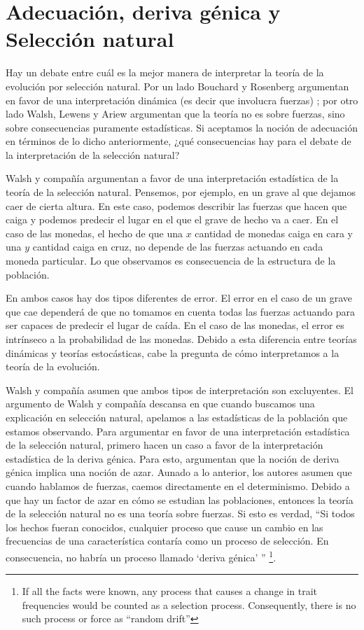  \section{Adecuación, deriva génica y Selección natural}

 \noindent Hay un debate entre cuál es la mejor manera de interpretar la teoría de la evolución por selección natural. Por un lado Bouchard y Rosenberg argumentan en favor de una interpretación dinámica (es decir que involucra fuerzas) \citeyear{Bouchard2004}; por otro lado Walsh, Lewens y Ariew \citeyear{Walsh2002} argumentan que la teoría no es sobre fuerzas, sino sobre consecuencias puramente estadísticas. Si aceptamos la noción de adecuación en términos de lo dicho anteriormente, ¿qué consecuencias hay para el debate de la interpretación de la selección natural?

 Walsh y compañía argumentan a favor de una interpretación estadística de la teoría de la selección natural. Pensemos, por ejemplo, en un grave al que dejamos caer de cierta altura. En este caso, podemos describir las fuerzas que hacen que caiga y podemos predecir el lugar en el que el grave de hecho va a caer. En el caso de las monedas, el hecho de que una $x$ cantidad de monedas caiga en cara y una $y$ cantidad caiga en cruz, no depende de las fuerzas actuando en cada moneda particular. Lo que observamos es consecuencia de la estructura de la población.

 En ambos casos hay dos tipos diferentes de error. El error en el caso de un grave que cae dependerá de que no tomamos en cuenta todas las fuerzas actuando para ser capaces de predecir el lugar de caída. En el caso de las monedas, el error es intrínseco a la probabilidad de las monedas. Debido a esta diferencia entre teorías dinámicas y teorías estocásticas, cabe la pregunta de cómo interpretamos a la teoría de la evolución.

 Walsh y compañía asumen que ambos tipos de interpretación son excluyentes. El argumento de Walsh y compañía descansa en que cuando buscamos una explicación en selección natural, apelamos a las estadísticas de la población que estamos observando. Para argumentar en favor de una interpretación estadística de la selección natural, primero hacen un caso a favor de la interpretación estadística de la deriva génica. Para esto, argumentan que la noción de deriva génica implica una noción de azar. Aunado a lo anterior, los autores asumen que cuando hablamos de fuerzas, caemos directamente en el determinismo. Debido a que hay un factor de azar en cómo se estudian las poblaciones, entonces la teoría de la selección natural no es una teoría sobre fuerzas. Si esto es verdad, ``Si todos los hechos fueran conocidos, cualquier proceso que cause un cambio en las frecuencias de una característica contaría como un proceso de selección. En consecuencia, no habría un proceso llamado `deriva génica' '' \citeyear[p. 457]{Walsh2002} \footnote{If all the facts were known, any process that causes a change in trait frequencies would be counted as a selection process. Consequently, there is no such process or force as ``random drift''}.

